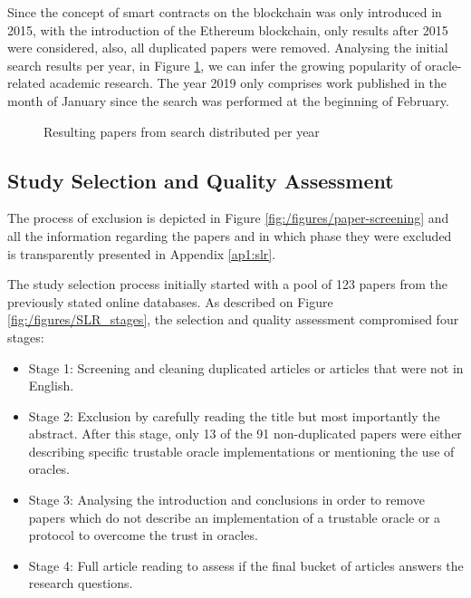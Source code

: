 \documentclass[final,3p,12pt,twocolumn]{elsarticle}
\begin{document}
Since the concept of smart contracts on the blockchain was only introduced in 2015, with the introduction of the Ethereum blockchain, only results after 2015 were considered, also, all duplicated papers were removed. Analysing the initial search results per year, in Figure \ref{search-results-per-year}, we can infer the growing popularity of oracle-related academic research. The year 2019 only comprises work published in the month of January since the search was performed at the beginning of February.

\begin{figure}[H]
  \centering
  \caption{Resulting papers from search distributed per year}
  \label{search-results-per-year}
\end{figure}


\subsection{Study Selection and Quality Assessment}
The process of exclusion is depicted in Figure \ref{fig:/figures/paper-screening} and all the information regarding the papers and in which phase they were excluded is transparently presented in Appendix \ref{ap1:slr}.

The study selection process initially started with a pool of 123 papers from the previously stated online databases. As described on Figure \ref{fig:/figures/SLR_stages}, the selection and quality assessment compromised four stages:
\begin{itemize}
  \item Stage 1: Screening and cleaning duplicated articles or articles that were not in English.
  \item Stage 2: Exclusion by carefully reading the title but most importantly the abstract. After this stage, only 13 of the 91 non-duplicated papers were either describing specific trustable oracle implementations or mentioning the use of oracles.
  \item Stage 3: Analysing the introduction and conclusions in order to remove papers which do not describe an implementation of a trustable oracle or a protocol to overcome the trust in oracles.
  \item Stage 4: Full article reading to assess if the final bucket of articles answers the research questions.
\end{itemize}
\end{document}
